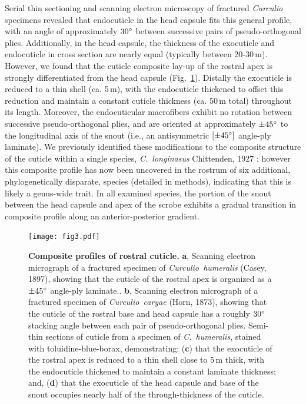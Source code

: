 \documentclass[twocolumn, linenumbers, superscriptaddress, nofootinbib]{revtex4-1}
\begin{document}
		Serial thin sectioning and scanning electron microscopy of fractured \textit{Curculio} specimens revealed that endocuticle in the head capsule fits this general profile, with an angle of approximately $30\degree$ between successive pairs of pseudo-orthogonal plies.
		Additionally, in the head capsule, the thickness of the exocuticle and endocuticle in cross section are nearly equal (typically between 20-30\,{\textmu}m).
		However, we found that the cuticle composite lay-up of the rostral apex is strongly differentiated from the head capsule (Fig.~\ref{fig::profile}).
		Distally the exocuticle is reduced to a thin shell (ca. 5\,{\textmu}m), with the endocuticle thickened to offset this reduction and maintain a constant cuticle thickness (ca. 50\,{\textmu}m total) throughout its length.
		Moreover, the endocuticular macrofibers exhibit no rotation between successive pseudo-orthogonal plies, and are oriented at approximately $\pm45\degree$ to the longitudinal axis of the snout (i.e., an antisymmetric $[\pm45\degree]$ angle-ply laminate).
		We previously identified these modifications to the composite structure of the cuticle within a single species, \textit{C.~longinasus} Chittenden, 1927 \cite{Jansen2016, Singh2016}; however this composite profile has now been uncovered in the rostrum of six additional, phylogenetically disparate, species (detailed in methods), indicating that this is likely a genus-wide trait.
		In all examined species, the portion of the snout between the head capsule and apex of the scrobe exhibits a gradual transition in composite profile along an anterior-posterior gradient.
		
		\begin{figure}
			\centering
			\texttt{[image: fig3.pdf]}
			\caption{\textbf{Composite profiles of rostral cuticle.}
				\textbf{a}, Scanning electron micrograph of a fractured specimen of \textit{Curculio~humeralis} (Casey, 1897), showing that the cuticle of the rostral apex is organized as a $\pm45\degree$ angle-ply laminate..
				\textbf{b}, Scanning electron micrograph of a fractured specimen of \textit{Curculio~caryae}  (Horn, 1873), showing that the cuticle of the rostral base and head capsule has a roughly $30\degree$ stacking angle between each pair of pseudo-orthogonal plies.
				Semi-thin sections of cuticle from a specimen of \textit{C.~humeralis}, stained with toluidine-blue-borax, demonstrating:
				(\textbf{c}) that the exocuticle of the rostral apex is reduced to a thin shell close to 5\,{\textmu}m thick, with the endocuticle thickened to maintain a constant laminate thickness; and,
				(\textbf{d}) that the exocuticle of the head capsule and base of the snout occupies nearly half of the through-thickness of the cuticle.
			}
			\label{fig::profile}
		\end{figure}
		
\end{document}

